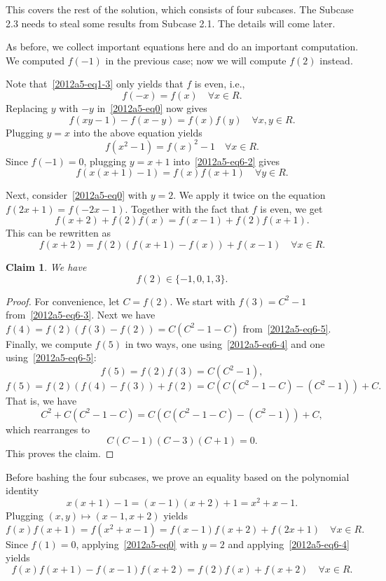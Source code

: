 \documentclass{article}
\newtheorem*{claim}{Claim}
\begin{document}
This covers the rest of the solution, which consists of four subcases.
The Subcase 2.3 needs to steal some results from Subcase 2.1.
The details will come later.

As before, we collect important equations here and do an important computation.
We computed $f(-1)$ in the previous case; now we will compute $f(2)$ instead.

Note that~\eqref{2012a5-eq1-3} only yields that $f$ is even, i.e.,
\[ f(-x) = f(x) \quad \forall x \in R. \tag{6.1}\label{2012a5-eq6-1} \]
Replacing $y$ with $-y$ in~\eqref{2012a5-eq0} now gives
\[ f(xy - 1) - f(x - y) = f(x) f(y) \quad \forall x, y \in R. \tag{6.2}\label{2012a5-eq6-2} \]
Plugging $y = x$ into the above equation yields
\[ f(x^2 - 1) = f(x)^2 - 1 \quad \forall x \in R. \tag{6.3}\label{2012a5-eq6-3} \]
Since $f(-1) = 0$, plugging $y = x + 1$ into~\eqref{2012a5-eq6-2} gives
\[ f(x(x + 1) - 1) = f(x) f(x + 1) \quad \forall y \in R. \tag{6.4}\label{2012a5-eq6-4} \]

Next, consider~\eqref{2012a5-eq0} with $y = 2$.
We apply it twice on the equation $f(2x + 1) = f(-2x - 1)$.
Together with the fact that $f$ is even, we get
\[ f(x + 2) + f(2) f(x) = f(x - 1) + f(2) f(x + 1). \]
This can be rewritten as
\[ f(x + 2) = f(2) (f(x + 1) - f(x)) + f(x - 1) \quad \forall x \in R. \tag{6.5}\label{2012a5-eq6-5} \]

\begin{claim}
We have \[ f(2) \in \{-1, 0, 1, 3\}. \]
\end{claim}
\begin{proof}
For convenience, let $C = f(2)$.
We start with $f(3) = C^2 - 1$ from~\eqref{2012a5-eq6-3}.
Next we have $f(4) = f(2) (f(3) - f(2)) = C (C^2 - 1 - C)$ from~\eqref{2012a5-eq6-5}.
Finally, we compute $f(5)$ in two ways, one using~\eqref{2012a5-eq6-4} and one using~\eqref{2012a5-eq6-5}:
\[ f(5) = f(2) f(3) = C(C^2 - 1), \]
\[ f(5) = f(2) (f(4) - f(3)) + f(2) = C(C(C^2 - 1 - C) - (C^2 - 1)) + C. \]
That is, we have
\[ C^2 + C(C^2 - 1 - C) = C(C(C^2 - 1 - C) - (C^2 - 1)) + C, \]
    which rearranges to
\[ C(C - 1)(C - 3)(C + 1) = 0. \]
This proves the claim.
\end{proof}

Before bashing the four subcases, we prove an equality based on the polynomial identity
\[ x(x + 1) - 1 = (x - 1)(x + 2) + 1 = x^2 + x - 1. \]
Plugging $(x, y) \mapsto (x - 1, x + 2)$ yields
\[ f(x) f(x + 1) = f(x^2 + x - 1) = f(x - 1) f(x + 2) + f(2x + 1) \quad \forall x \in R. \]
Since $f(1) = 0$, applying~\eqref{2012a5-eq0} with $y = 2$ and applying~\eqref{2012a5-eq6-4} yields
\[ f(x) f(x + 1) - f(x - 1) f(x + 2) = f(2) f(x) + f(x + 2) \quad \forall x \in R. \tag{6.6}\label{2012a5-eq6-6} \]
\end{document}
